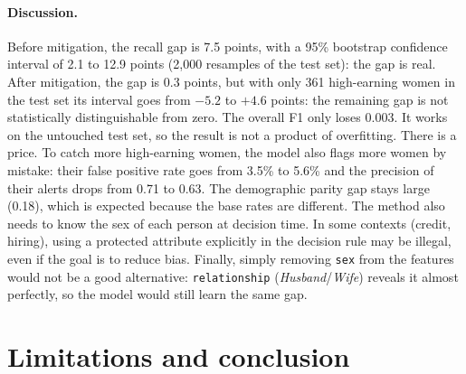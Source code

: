 \documentclass[11pt,a4paper]{article}
\begin{document}
\paragraph{Discussion.}
Before mitigation, the recall gap is 7.5 points, with a 95\% bootstrap confidence interval of 2.1 to 12.9 points (2{,}000 resamples of the test set): the gap is real. After mitigation, the gap is 0.3 points, but with only 361 high-earning women in the test set its interval goes from $-5.2$ to $+4.6$ points: the remaining gap is not statistically distinguishable from zero. The overall F1 only loses 0.003. It works on the untouched test set, so the result is not a product of overfitting.
There is a price. To catch more high-earning women, the model also flags more women by mistake: their false positive rate goes from 3.5\% to 5.6\% and the precision of their alerts drops from 0.71 to 0.63. The demographic parity gap stays large (0.18), which is expected because the base rates are different.
The method also needs to know the sex of each person at decision time. In some contexts (credit, hiring), using a protected attribute explicitly in the decision rule may be illegal, even if the goal is to reduce bias.
Finally, simply removing \texttt{sex} from the features would not be a good alternative: \texttt{relationship} (\emph{Husband}/\emph{Wife}) reveals it almost perfectly, so the model would still learn the same gap.

\section{Limitations and conclusion}
\label{sec:conclusion}
\end{document}
